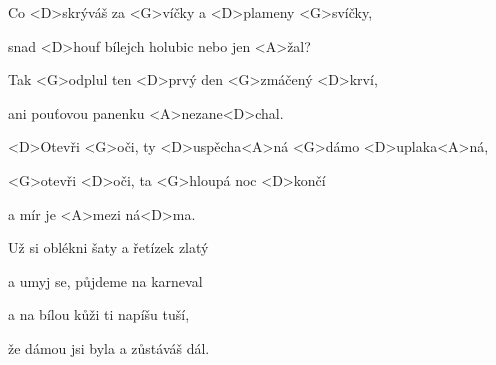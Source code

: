 


\zs
Co <D>skrýváš za <G>víčky a <D>plameny <G>svíčky,

snad <D>houf bílejch holubic nebo jen <A>žal?

Tak <G>odplul ten <D>prvý den <G>zmáčený <D>krví,

ani pouťovou panenku <A>nezane<D>chal.
\ks

\zr
<D>Otevři <G>oči, ty <D>uspěcha<A>ná <G>dámo <D>uplaka<A>ná,

<G>otevři <D>oči, ta <G>hloupá noc <D>končí

a mír je <A>mezi ná<D>ma.
\kr

\zs
Už si oblékni šaty a řetízek zlatý

a umyj se, půjdeme na karneval

a na bílou kůži ti napíšu tuší,

že dámou jsi byla a zůstáváš dál.
\ks

\zr \kr

\kp
